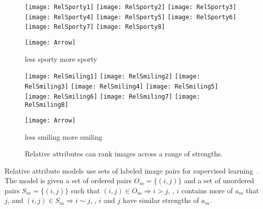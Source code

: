 \documentclass[10pt,twocolumn,letterpaper]{article}
\begin{document}
\begin{figure}
    \centering
    
    \texttt{[image: RelSporty1]}
    \texttt{[image: RelSporty2]}
    \texttt{[image: RelSporty3]}
    \texttt{[image: RelSporty4]}
    \texttt{[image: RelSporty5]}
    \texttt{[image: RelSporty6]}
    \texttt{[image: RelSporty7]}
    \texttt{[image: RelSporty8]}
    
    \texttt{[image: Arrow]}
    
    \vspace{-0.1cm}
    
    less sporty \hfill more sporty
    
    \vspace{0.25cm}
    
    \texttt{[image: RelSmiling1]}
    \texttt{[image: RelSmiling2]}
    \texttt{[image: RelSmiling3]}
    \texttt{[image: RelSmiling4]}
    \texttt{[image: RelSmiling5]}
    \texttt{[image: RelSmiling6]}
    \texttt{[image: RelSmiling7]}
    \texttt{[image: RelSmiling8]}
    
    \texttt{[image: Arrow]}
    
    \vspace{-0.1cm}
    
    less smiling \hfill more smiling
    
    \vspace{0.1cm}
    
    \caption[Relative Attributes]{Relative attributes can rank images across a range of strengths.}
    \label{fig:rel}
\end{figure}

Relative attribute models use sets of labeled image pairs for supervised learning~\cite{relativeattributes, robustsubjective, partattribute, deeprelative, deeprelative2, deeprelative3}. The model is given a set of ordered pairs $O_m = \{(i, j)\}$ and a set of unordered pairs $S_m = \{(i, j)\}$ such that $(i, j) \in O_m \Longrightarrow i > j$, \ie, $i$ contains more of $a_m$ that $j$, and $(i, j) \in S_m \Longrightarrow i \sim j$, \ie, $i$ and $j$ have similar strengths of $a_m$.
\end{document}
